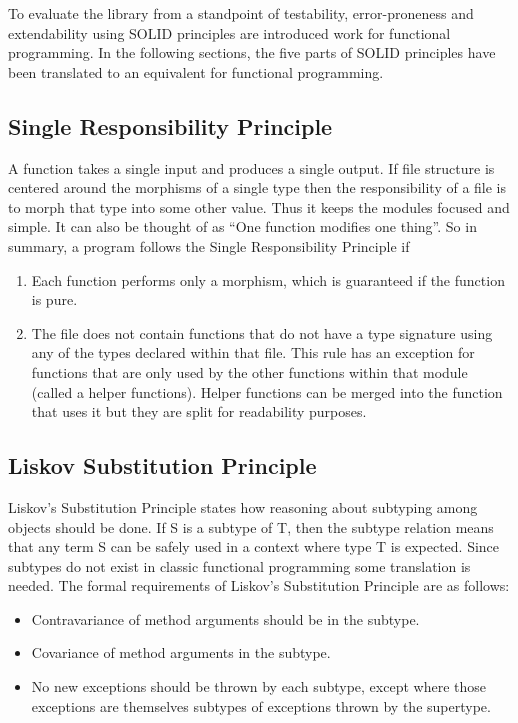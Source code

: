 To evaluate the library from a standpoint of testability, error-proneness and
extendability using SOLID principles are introduced work for functional
programming. In the following sections, the five parts of SOLID principles have
been translated to an equivalent for functional programming.

\subsection{Single Responsibility Principle}

A function takes a single input and produces a single output. If file structure
is centered around the morphisms of a single type then the responsibility of a
file is to morph that type into some other value. Thus it keeps the modules
focused and simple. It can also be thought of as ``One function modifies one
thing''. So in summary, a program follows the Single Responsibility Principle if 

\begin{enumerate}
    \item Each function performs only a morphism, which is guaranteed if the
        function is pure.
    \item The file does not contain functions that do not have a type signature
        using any of the types declared within that file. This rule has
        an exception for functions that are only used by the other functions
        within that module (called a helper functions). Helper functions can be
        merged into the function that uses it but they are split for
        readability purposes.
\end{enumerate}

\subsection{Liskov Substitution Principle}

Liskov's Substitution Principle states how reasoning about subtyping among
objects should be done. If S is a subtype of T, then the subtype relation means
that any term S can be safely used in a context where type T is expected. Since
subtypes do not exist in classic functional programming some translation is
needed. The formal requirements of Liskov's Substitution Principle are as
follows:

\begin{itemize}
    \item Contravariance of method arguments should be in the subtype.
    \item Covariance of method arguments in the subtype.
    \item No new exceptions should be thrown by each subtype, except where
        those exceptions are themselves subtypes of exceptions thrown by the
        supertype.
\end{itemize}

